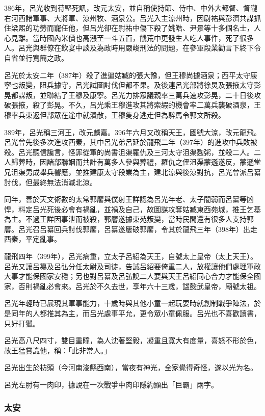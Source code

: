 386年，呂光收到苻堅死訊，改元太安，並自稱使持節、侍中、中外大都督、督隴右河西諸軍事、大將軍、涼州牧、酒泉公。呂光入主涼州時，因尉祐與彭濟共謀抓住梁熙的功勞而寵任他，但呂光卻在尉祐中傷下殺了姚皓、尹景等十多個名士，人心見離。當時國內米價也高漲至一斗五百，饑荒中更發生人吃人事件，死了很多人。呂光與群僚在飲宴中談及為政時用嚴峻刑法的問題，在參軍段業勸言下終下令自省並行寬簡之政。

呂光於太安二年（387年）殺了進逼姑臧的張大豫，但王穆尚據酒泉；西平太守康寧也叛變，阻兵據守，呂光試圖討伐但都不果。及後連呂光部將徐炅及張掖太守彭晃都謀叛，並聯結了王穆及康寧。呂光力排眾議親率三萬兵速攻彭晃，二十日後攻破張掖，殺了彭晃。不久，呂光乘王穆進攻其將索嘏的機會率二萬兵襲破酒泉，王穆率兵東返但部眾在途中就潰散，王穆隻身逃走但為騂馬令郭文所殺。

389年，呂光稱三河王，改元麟嘉。396年六月又改稱天王，國號大涼，改元龍飛。呂光曾先後多次進攻西秦，其中呂光弟呂延於龍飛二年（397年）的進攻中兵敗被殺。呂光聽信讒言，怪罪從軍的尚書沮渠羅仇及三河太守沮渠麴粥，並殺二人。二人歸葬時，因諸部聯姻而共計有萬多人參與葬禮，羅仇之侄沮渠蒙遜遂反，蒙遜堂兄沮渠男成舉兵響應，並推建康太守段業為主，建北涼與後涼對抗，呂光曾派呂纂討伐，但最終無法消滅北涼。

同年，善於天文術數的太常郭黁與僕射王詳認為呂光年老、太子闇弱而呂纂等凶悍，料定呂光死後必會有禍亂，並禍及自己，故圖謀攻奪姑臧東西苑城，推王乞基為主。不過王詳因事泄而被殺，郭黁遂據東苑叛變，當時民間還有很多人支持郭黁。呂光召呂纂回兵討伐郭黁，呂纂遂屢破郭黁，令其於龍飛三年（398年）出走西秦，平定亂事。

龍飛四年（399年），呂光病重，立太子呂紹為天王，自號太上皇帝（太上天王）。呂光又讓呂纂及呂弘分任太尉及司徒，告誡呂紹要倚重二人，放權讓他們處理軍政大事才能保國家安穩；另也對呂纂及呂弘說二人要與天王呂紹同心合力才能保全國家，否則禍亂必會來。呂光於不久去世，享年六十三歲，諡懿武皇帝，廟號太祖。

呂光年輕時已展現其軍事能力，十歲時與其他小童一起玩耍時就創制戰爭陣法，於是同年的人都推其為主，而呂光處事平允，更令眾小童佩服。呂光也不喜歡讀書，只好打獵。

呂光高八尺四寸，雙目重瞳，為人沈著堅毅，凝重且寛大有度量，喜怒不形於色，故王猛賞識他，稱：「此非常人。」

呂光出生於枋頭（今河南浚縣西南），當夜有神光，全家覺得奇怪，遂以光为名。

呂光左肘有一肉印，據說在一次戰爭中肉印隱約顯出「巨霸」兩字。

\subsubsection{太安}

